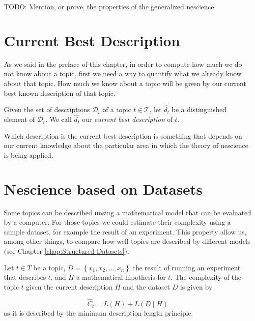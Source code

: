 {\color{red} TODO: Mention, or prove, the properties of the generalized nescience}

%
%

\section{Current Best Description}

As we said in the preface of this chapter, in order to compute how much we do not know about a topic, first we need a way to quantify what we already know about that topic. How much we know about a topic will be given by our current best known description of that topic.

\begin{definition}
Given the set of descriptions $\mathcal{D}_t$ of a topic $t \in \mathcal{T}$, let $\hat{d_{t}}$ be a distinguished element of $\mathcal{D}_t$. We call $\hat{d_{t}}$ our \emph{current best description} of $t$.
\end{definition}

Which description is the current best description is something that depends on our current knowledge about the particular area in which the theory of nescience is being applied.


%
%

\section{Nescience based on Datasets}
\label{sec:nescience_datasets}

Some topics can be described unsing a mathematical model that can
be evaluated by a computer. For those topics we could estimate their
complexity using a sample dataset, for example the result of an experiment.
This property allow us, among other things, to compare how well topics
are described by different models (see Chapter \ref{chap:Structured-Datasets}).

\begin{definition}
Let $t\in T$ be a topic, $D=\left\{ x_{1},x_{2},\ldots,x_{n}\right\} $
the result of running an experiment that describes $t$, and $H$
a mathematical hipothesis for $t$. The complexity of the topic $t$
given the current description $H$ and the dataset $D$ is given by

\[
\hat{C}_{t}=L(H)+L(D\mid H)
\]
as it is described by the minimum description length principle.
\end{definition}

